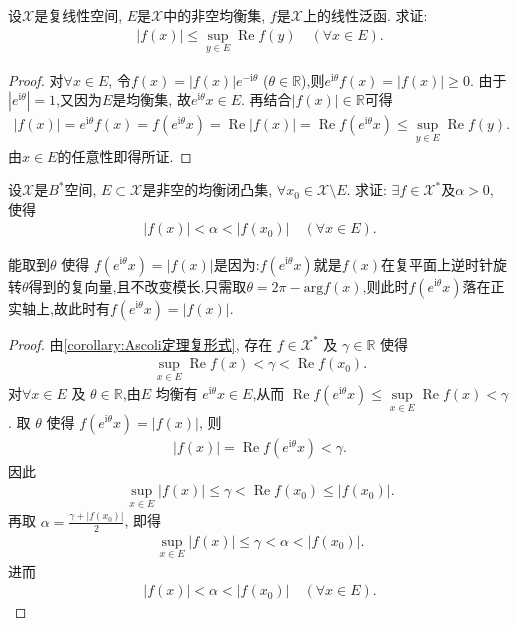 \documentclass[../../main.tex]{subfiles}%
\begin{document}
\begin{example}
设$\mathscr{X}$是复线性空间, $E$是$\mathscr{X}$中的非空均衡集, $f$是$\mathscr{X}$上的线性泛函. 求证:
\begin{align*}
|f(x)| \leqslant \sup\limits_{y \in E} \operatorname{Re} f(y) \quad (\forall x \in E).
\end{align*}
\end{example}
\begin{proof}
对$\forall x\in E$, 令$f(x)=|f(x)|e^{-\mathrm{i}\theta}$ ($\theta\in\mathbb{R}$),则$e^{\mathrm{i}\theta}f(x)=|f(x)|\geqslant 0$. 由于$|e^{\mathrm{i}\theta}|= 1$,又因为$E$是均衡集, 故$e^{\mathrm{i}\theta}x\in E$. 再结合$|f(x)|\in \mathbb{R}$可得
\begin{align*}
|f(x)| = e^{\mathrm{i}\theta}f(x) = f(e^{\mathrm{i}\theta}x) = \operatorname{Re}|f(x)| = \operatorname{Re} f(e^{\mathrm{i}\theta}x) \leqslant \sup\limits_{y \in E} \operatorname{Re} f(y).
\end{align*}
由$x\in E$的任意性即得所证.
\end{proof}

\begin{example}
设$\mathscr{X}$是$B^*$空间, $E \subset \mathscr{X}$是非空的均衡闭凸集, $\forall x_0 \in \mathscr{X} \setminus E$. 求证: $\exists f \in \mathscr{X}^*$及$\alpha > 0$, 使得
\begin{align*}
|f(x)| < \alpha < |f(x_0)| \quad (\forall x \in E).
\end{align*}
\end{example}
\begin{note}
能取到$\theta$ 使得 $f(e^{\mathrm{i}\theta}x) = |f(x)|$是因为:$f(e^{\mathrm{i}\theta}x)$就是$f(x)$在复平面上逆时针旋转$\theta$得到的复向量,且不改变模长.只需取$\theta = 2\pi-\text{arg}f(x)$,则此时$f(e^{\mathrm{i}\theta}x)$落在正实轴上,故此时有$f(e^{\mathrm{i}\theta}x) = |f(x)|$.
\end{note}
\begin{proof}
由\cref{corollary:Ascoli定理复形式}, 存在 $f \in \mathscr{X}^*$ 及 $\gamma \in \mathbb{R}$ 使得
\begin{align*}
\sup\limits_{x \in E} \operatorname{Re} f(x) < \gamma < \operatorname{Re} f(x_0).
\end{align*}
对$\forall x \in E$ 及 $\theta \in \mathbb{R}$,由$E$ 均衡有 $e^{\mathrm{i}\theta}x \in E$,从而 $\operatorname{Re} f(e^{\mathrm{i}\theta}x)\leqslant \sup\limits_{x \in E} \operatorname{Re} f(x) < \gamma$. 取 $\theta$ 使得 $f(e^{\mathrm{i}\theta}x) = |f(x)|$, 则
\begin{align*}
|f(x)|=\operatorname{Re} f(e^{\mathrm{i}\theta}x) < \gamma.
\end{align*}
因此
\begin{align*}
\sup_{x \in E} |f(x)| \leqslant \gamma < \operatorname{Re} f(x_0)\leqslant |f(x_0)|.
\end{align*}
再取 $\alpha = \frac{\gamma + |f(x_0)|}{2}$, 即得
\begin{align*}
\sup_{x \in E} |f(x)| \leqslant \gamma <\alpha <|f(x_0)|.
\end{align*}
进而
\begin{align*}
|f(x)| < \alpha < |f(x_0)| \quad (\forall x \in E).
\end{align*}
\end{proof}
\end{document}
